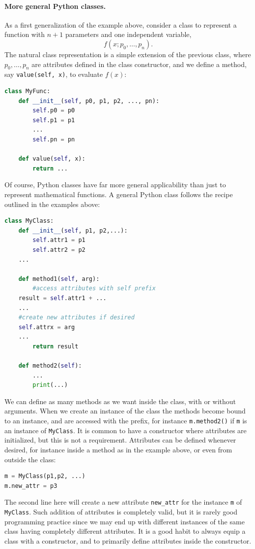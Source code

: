 \documentclass[graybox,envcountchap,sectrefs,final]{svmonodo}
\begin{document}
\paragraph{More general Python classes.}
As a first
generalization of the example above, consider a class to represent a function with $n+1$ parameters and one
independent variable,
\[ f(x; p_0,\ldots,p_n) .\]
The natural class representation is a simple extension of the previous class, where
$p_0,\ldots,p_n$ are attributes defined in the class constructor, and we define a method, say \texttt{value(self, x)}, to evaluate
$f(x)$:
\begin{lstlisting}[language=Python,style=blue1]
class MyFunc:
    def __init__(self, p0, p1, p2, ..., pn):
        self.p0 = p0
        self.p1 = p1
        ...
        self.pn = pn

    def value(self, x):
        return ...
\end{lstlisting}

Of course, Python classes have far more general applicability than just to represent mathematical functions.
A general Python class follows the recipe outlined in the examples above:
\begin{lstlisting}[language=Python,style=blue1]
class MyClass:
    def __init__(self, p1, p2,...):
        self.attr1 = p1
        self.attr2 = p2
	...

    def method1(self, arg):
    	#access attributes with self prefix
	result = self.attr1 + ...
	...
	#create new attributes if desired
	self.attrx = arg
	...
        return result

    def method2(self):
    	...
        print(...)
\end{lstlisting}
We can define as many methods as we want inside the class, with or without arguments. When we create an instance of the
class the methods become bound to an instance, and are accessed with the prefix, for instance \texttt{m.method2()} if \texttt{m} is an
instance of \texttt{MyClass}. It is common to have a constructor where attributes are initialized, but this is not a requirement.
Attributes can be defined whenever desired, for instance inside a method as in the example above, or even from outside
the class:
\begin{lstlisting}[language=Python,style=blue1]
m = MyClass(p1,p2, ...)
m.new_attr = p3
\end{lstlisting}
The second line here will create a new attribute \Verb!new_attr! for the instance \texttt{m} of \texttt{MyClass}. Such addition of attributes is
completely valid, but it is rarely good programming practice since we may end up with different instances of the same class having
completely different attributes. It is a good habit to always equip a class with a constructor, and to primarily
define attributes inside the constructor.
\end{document}
